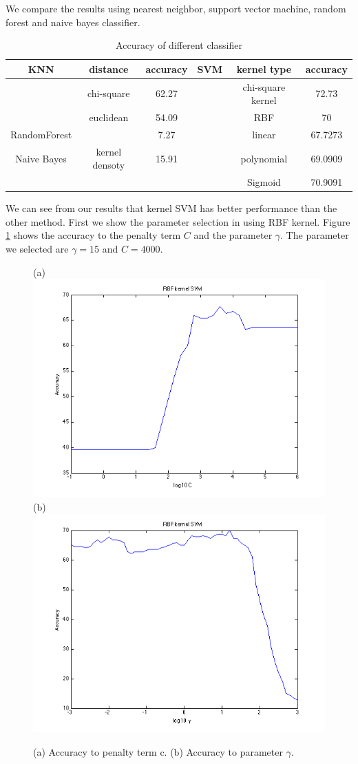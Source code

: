\documentclass{article} %
\begin{document}
We compare the results using nearest neighbor, support vector machine, random forest and naive bayes classifier.


\begin{table}[t]
\caption{Accuracy of different classifier}
\begin{center}
\begin{tabular}{|c|c|c|c|c|c|}
\hline
    KNN & distance      &accuracy   &SVM    & kernel type       &accuracy\\
\hline
        & chi-square    &62.27      &       &chi-square kernel  &72.73\\
\hline
        & euclidean     &54.09      &       & RBF               &70\\
\hline
RandomForest &         & 7.27           &       & linear            &67.7273\\
\hline
Naive Bayes  & kernel densoty  & 15.91           &       & polynomial        &69.0909\\
\hline
        &               &           &       & Sigmoid           &70.9091\\
\hline
\end{tabular}
\end{center}
\end{table}

We can see from our results that kernel SVM has better performance than the other method. First we show the parameter selection in using RBF kernel. Figure \ref{fig:RBF} shows the accuracy to the penalty term $C$ and the parameter $\gamma$. The parameter we selected are $\gamma = 15$ and $C = 4000$.

\begin{figure}[ht!]
    \centering
    {(a)\includegraphics[width=0.45\linewidth]{../Figure/RBF_cost_accuracy}
    (b)\includegraphics[width=0.45\linewidth]{../Figure/RBF_gamma_accuracy}}
    \caption{(a) Accuracy to penalty term c. (b) Accuracy to parameter $\gamma$. }
    \label{fig:RBF}
\end{figure}
\end{document}
